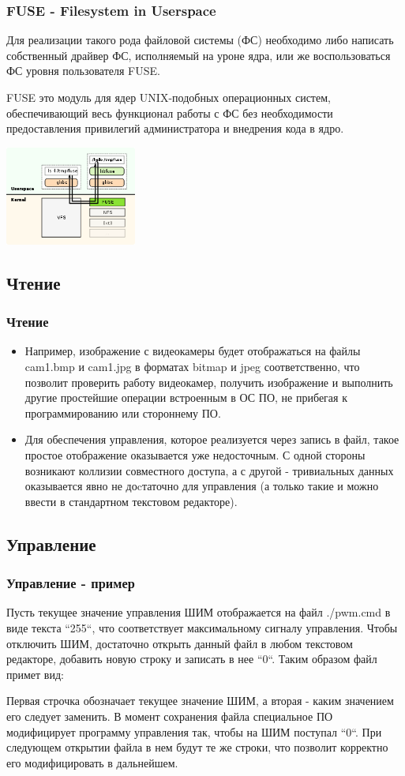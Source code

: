 \documentclass{beamer}
\begin{document}
\begin{frame}
\frametitle{FUSE - Filesystem in Userspace}
Для реализации такого рода файловой системы (ФС) необходимо либо написать
собственный драйвер ФС, исполняемый на уроне ядра, или же воспользоваться
ФС уровня пользователя FUSE.

FUSE это модуль для ядер UNIX-подобных операционных систем, обеспечивающий весь
функционал работы с ФС без необходимости предоставления привилегий администратора и внедрения кода в ядро.

\includegraphics[width=4.3cm]{fuse.png}
\end{frame}

\subsection{Чтение}
\begin{frame}
\frametitle{Чтение}
\begin{itemize}
\item<1> Например, изображение с видеокамеры будет отображаться на файлы
cam1.bmp и cam1.jpg в форматах bitmap и jpeg соответственно, что позволит
проверить работу видеокамер, получить изображение и выполнить другие простейшие
операции встроенным в ОС ПО, не прибегая к программированию или стороннему ПО.
\item<1> Для обеспечения управления, которое реализуется через запись в файл,
такое простое отображение оказывается уже недосточным. С одной стороны
возникают коллизии совместного доступа, а с другой - тривиальных данных оказывается явно не
доcтаточно для управления (а только такие и можно ввести в стандартном текстовом
редакторе).
\end{itemize}
\end{frame}

\subsection{Управление}
\begin{frame}
\frametitle{Управление - пример}
Пусть текущее значение управления ШИМ отображается на файл ./pwm.cmd в виде
текста ``255``, что соответствует максимальному сигналу управления. Чтобы
отключить ШИМ, достаточно открыть данный файл в любом текстовом редакторе,
добавить новую строку и записать в нее ``0``.
Таким образом файл примет вид:

Первая строчка обозначает текущее значение ШИМ, а вторая - каким значением его
следует заменить. В момент сохранения файла специальное ПО модифицирует
программу управления так, чтобы на ШИМ поступал ``0``. 
При следующем открытии файла в нем будут те же строки, что позволит корректно его 
модифицировать в дальнейшем.
\end{frame}
\end{document}
